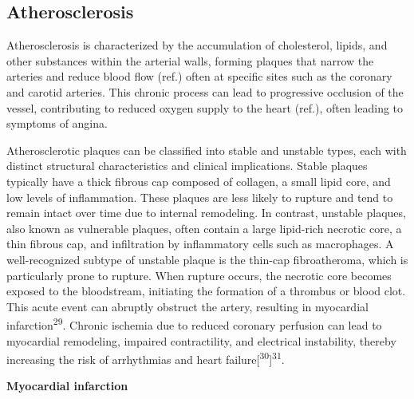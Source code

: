 \documentclass[
  a4paper,
  headsepline=true,
  open=any]{scrbook}
\begin{document}
\hypertarget{atherosclerosis}{%
\subsection{Atherosclerosis}\label{atherosclerosis}}

Atherosclerosis is characterized by the accumulation of cholesterol,
lipids, and other substances within the arterial walls, forming plaques
that narrow the arteries and reduce blood flow (ref.) often at specific
sites such as the coronary and carotid arteries. This chronic process
can lead to progressive occlusion of the vessel, contributing to reduced
oxygen supply to the heart (ref.), often leading to symptoms of angina.

Atherosclerotic plaques can be classified into stable and unstable
types, each with distinct structural characteristics and clinical
implications. Stable plaques typically have a thick fibrous cap composed
of collagen, a small lipid core, and low levels of inflammation. These
plaques are less likely to rupture and tend to remain intact over time
due to internal remodeling. In contrast, unstable plaques, also known as
vulnerable plaques, often contain a large lipid-rich necrotic core, a
thin fibrous cap, and infiltration by inflammatory cells such as
macrophages. A well-recognized subtype of unstable plaque is the
thin-cap fibroatheroma, which is particularly prone to rupture. When
rupture occurs, the necrotic core becomes exposed to the bloodstream,
initiating the formation of a thrombus or blood clot. This acute event
can abruptly obstruct the artery, resulting in myocardial
infarction\textsuperscript{29}. Chronic ischemia due to reduced coronary
perfusion can lead to myocardial remodeling, impaired contractility, and
electrical instability, thereby increasing the risk of arrhythmias and
heart failure{[}\textsuperscript{30}{]}\textsuperscript{31}.

\textbf{Myocardial infarction}
\end{document}
